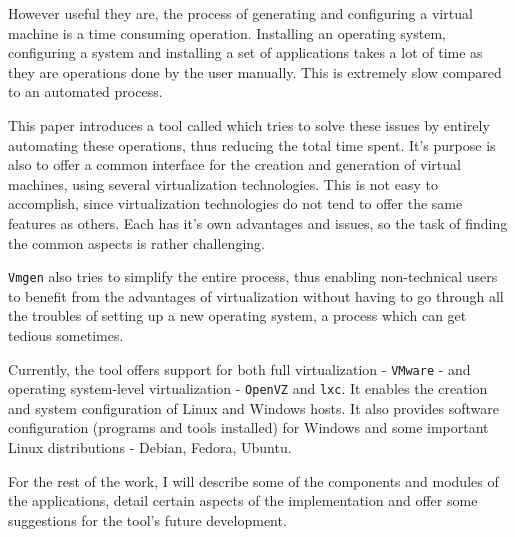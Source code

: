 However useful they are, the process of generating and configuring a virtual 
machine is a time consuming operation. Installing an operating system, 
configuring a system and installing a set of applications takes a lot of time as 
they are operations done by the user manually. This is extremely slow compared 
to an automated process.

This paper introduces a tool called \texttt{\project} which tries to solve these issues by 
entirely automating these operations, thus reducing the total time spent. It's 
purpose is also to offer a common interface for the creation and generation of 
virtual machines, using several virtualization technologies. This is not easy to 
accomplish, since virtualization technologies do not tend to offer the same 
features as others. Each has it's own advantages and issues, so the task of 
finding the common aspects is rather challenging.

\texttt{Vmgen} also tries to simplify the entire process, thus enabling non-technical 
users to benefit from the advantages of virtualization without having to go 
through all the troubles of setting up a new operating system, a process which 
can get tedious sometimes.

Currently, the tool offers support for both full virtualization - \texttt{VMware} - and 
operating system-level virtualization - \texttt{OpenVZ} and \texttt{lxc}. It enables the creation 
and system configuration of Linux and Windows hosts. It also provides software 
configuration (programs and tools installed) for Windows and some important 
Linux distributions - Debian, Fedora, Ubuntu.

For the rest of the work, I will describe some of the components and modules 
of the applications, detail certain aspects of the implementation and offer 
some suggestions for the tool's future development.